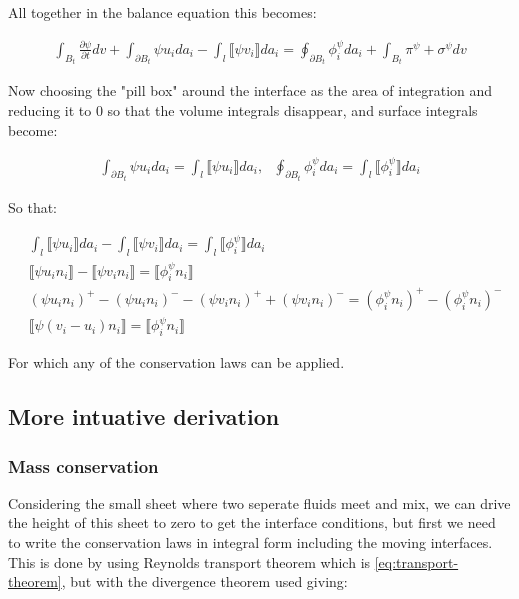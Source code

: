 \documentclass[a4paper,12pt]{article}
\newcommand{\pd}[2]{\frac{\partial #1}{\partial #2}}
\begin{document}
All together in the balance equation this becomes:

\begin{align}
  \int_{B_t} \pd{\psi}{t}dv + \int_{\partial B_t}\psi u_i da_i - \int_{l}\llbracket\psi v_i\rrbracket da_i = \oint_{\partial B_t} \phi_i^\psi da_i + \int_{B_t} \pi^\psi + \sigma^\psi dv
\end{align}

Now choosing the "pill box" around the interface as the area of integration and reducing it to 0 so that the volume integrals disappear, and surface integrals become:

\begin{align}
  \int_{\partial B_t}\psi u_i da_i = \int_{l}\llbracket \psi u_i \rrbracket da_i, ~~~ \oint_{\partial B_t} \phi_i^\psi da_i = \int_{l} \llbracket \phi_i^\psi \rrbracket da_i
\end{align}


So that:

\begin{align}
  &\int_{l}\llbracket\psi u_i\rrbracket da_i - \int_{l}\llbracket\psi v_i\rrbracket da_i = \int_{l} \llbracket\phi_i^\psi\rrbracket da_i\\
  &\llbracket\psi u_in_i\rrbracket - \llbracket\psi v_in_i\rrbracket = \llbracket\phi_i^\psi n_i\rrbracket\\
  & (\psi u_in_i)^+ - (\psi u_in_i)^- - (\psi v_in_i)^+ + (\psi v_in_i)^- = (\phi_i^\psi n_i)^+ - (\phi_i^\psi n_i)^- \\
  &\llbracket \psi (v_i - u_i)n_i \rrbracket = \llbracket \phi_i^\psi n_i \rrbracket
\end{align}

For which any of the conservation laws can be applied.

\subsection{More intuative derivation}
\subsubsection{Mass conservation}

Considering the small sheet where two seperate fluids meet and mix, we can drive the height of this sheet to zero to get the interface conditions, but first we need to write the conservation laws in integral form including the moving interfaces. This is done by using Reynolds transport theorem which is \eqref{eq:transport-theorem}, but with the divergence theorem used giving:
\end{document}
